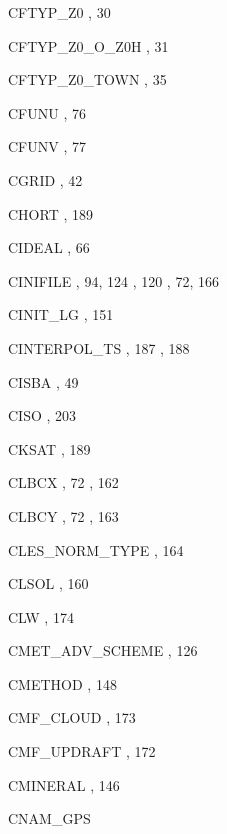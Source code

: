 \begin{theindex}
  \item CFTYP\_Z0
    \subitem {},  30
  \item CFTYP\_Z0\_O\_Z0H
    \subitem {},  31
  \item CFTYP\_Z0\_TOWN
    \subitem {},  35
  \item CFUNU
    \subitem {},  76
  \item CFUNV
    \subitem {},  77
  \item CGRID
    \subitem {},  42
  \item CHORT
    \subitem {},  189
  \item CIDEAL
    \subitem {},  66
  \item CINIFILE
    \subitem {},  94, 124
    \subitem {},  120
    \subitem {},  72, 166
  \item CINIT\_LG
    \subitem {},  151
  \item CINTERPOL\_TS
    \subitem {},  187
    \subitem {},  188
  \item CISBA
    \subitem {},  49
  \item CISO
    \subitem {},  203
  \item CKSAT
    \subitem {},  189
  \item CLBCX
    \subitem {},  72
    \subitem {},  162
  \item CLBCY
    \subitem {},  72
    \subitem {},  163
  \item CLES\_NORM\_TYPE
    \subitem {},  164
  \item CLSOL
    \subitem {},  160
  \item CLW
    \subitem {},  174
  \item CMET\_ADV\_SCHEME
    \subitem {},  126
  \item CMETHOD
    \subitem {},  148
  \item CMF\_CLOUD
    \subitem {},  173
  \item CMF\_UPDRAFT
    \subitem {},  172
  \item CMINERAL
    \subitem {},  146
  \item CNAM\_GPS

\end{theindex}
